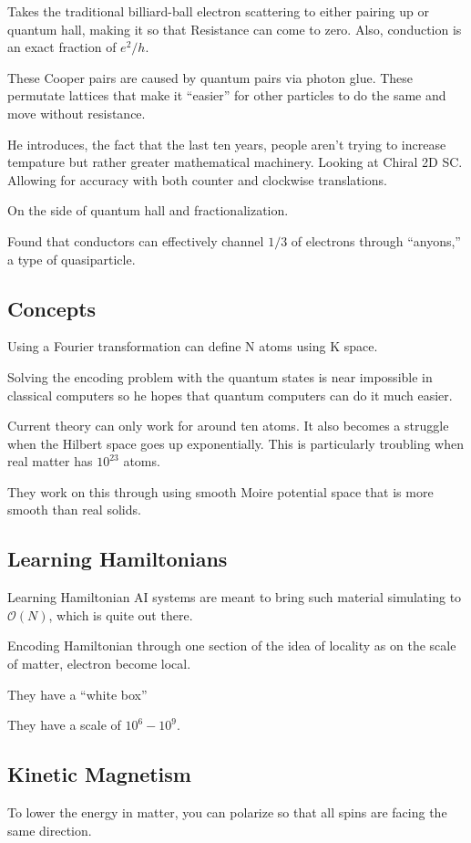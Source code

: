 Takes the traditional billiard-ball electron scattering to either pairing up or quantum hall, making it so that Resistance can come to zero. Also, conduction is an exact fraction of $e^2/h$.

These Cooper pairs are caused by quantum pairs via photon glue. These permutate lattices that make it ``easier'' for other particles to do the same and move without resistance.

He introduces, the fact that the last ten years, people aren't trying to increase tempature but rather greater mathematical machinery. Looking at Chiral 2D SC. Allowing for accuracy with both counter and clockwise translations.

On the side of quantum hall and fractionalization.

Found that conductors can effectively channel $1/3$ of electrons through ``anyons,'' a type of quasiparticle.

\subsection{Concepts}

Using a Fourier transformation can define N atoms using K space.

Solving the encoding problem with the quantum states is near impossible in classical computers so he hopes that quantum computers can do it much easier.

Current theory can only work for around ten atoms. It also becomes a struggle when the Hilbert space goes up exponentially. This is particularly troubling when real matter has $10^{23}$ atoms.

They work on this through using smooth Moire potential space that is more smooth than real solids.

\subsection{Learning Hamiltonians}

Learning Hamiltonian AI systems are meant to bring such material simulating to $\mathcal{O}(N)$, which is quite out there.

Encoding Hamiltonian through one section of the idea of locality as on the scale of matter, electron become local.

They have a ``white box''

They have a scale of $10^6 - 10^9$.


\subsection{Kinetic Magnetism}
To lower the energy in matter, you can polarize so that all spins are facing the same direction.

